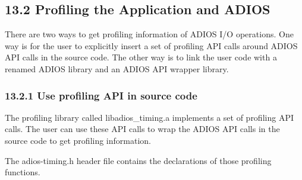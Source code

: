 \vspace{10pt}
\subsection*{{\large 13.2 }{\large \textbf{Profiling the Application and ADIOS}}}

\vspace{10pt}
There are two ways to get profiling information of ADIOS I/O operations. One way 
is for the user to explicitly insert a set of profiling API calls around ADIOS 
API calls in the source code. The other way is to link the user code with a renamed 
ADIOS library and an ADIOS API wrapper library. \label{HToc84890316}\label{HToc212016691}\label{HToc212016933}\label{HToc182553458}

\vspace{10pt}
\subsubsection*{{\large \textbf{13.2.1 Use profiling API in source code}}}

\vspace{10pt}
The profiling library called libadios\_timing.a implements a set of profiling API 
calls. The user can use these API calls to wrap the ADIOS API calls in the source 
code to get profiling information. 

\vspace{10pt}
The adios-timing.h header file contains the declarations of those profiling functions. 

